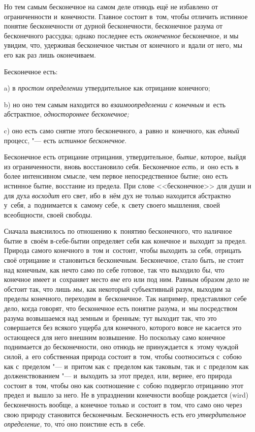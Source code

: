 Но тем самым бесконечное на самом деле отнюдь ещё не избавлено от
ограниченности и~конечности. Главное состоит в~том, чтобы отличить истинное
понятие бесконечности от дурной бесконечности, бесконечное разума от
бесконечного рассудка; однако последнее есть {\em оконеченное} бесконечное, и
мы увидим, что, удерживая бесконечное чистым от конечного и~вдали от него, мы
его как раз лишь оконечиваем.

Бесконечное есть:

a) в {\em простом определении} утвердительное как отрицание конечного;

b) но оно тем самым находится во {\em взаимоопределении
с конечным} и~есть абстрактное, {\em одностороннее бесконечное;}

c) оно есть само снятие этого бесконечного, а~равно и~конечного, как
{\em единый} процесс, "--- есть {\em истинное бесконечное}.


Бесконечное есть отрицание отрицания, утвердительное,
{\em бытие,} которое, выйдя из ограниченности, вновь
восстановило себя. Бесконечное {\em есть,} и~оно есть в
более интенсивном смысле, чем первое непосредственное бытие; оно есть
истинное бытие, восстание из предела. При слове <<бесконечное>> для души и
для духа {\em восходит} его свет, ибо в~нём дух не
только находится абстрактно у~себя, а~поднимается к~самому себе, к~свету
своего мышления, своей всеобщности, своей свободы.

Сначала выяснилось по отношению к~понятию бесконечного, что наличное бытие
в~своём в-себе-бытии определяет себя как конечное и~выходит за предел. Природа
самого конечного в~том и~состоит, чтобы выходить за себя, отрицать своё
отрицание и~становиться бесконечным. Бесконечное, стало быть, не стоит над
конечным, как нечто само по себе готовое, так что выходило бы, что конечное
имеет и~сохраняет место {\em вне} его или под ним. Равным образом дело не
обстоит так, что лишь {\em мы,} как некоторый субъективный разум, выходим за
пределы конечного, переходим в~бесконечное. Так например, представляют себе
дело, когда говорят, что бесконечное есть понятие разума, и~мы посредством
разума возвышаемся над земным и~бренным; тут выходит так, что это совершается
без всякого ущерба для конечного, которого вовсе не касается это остающееся для
него внешним возвышение. Но поскольку само конечное поднимается до
бесконечности, оно отнюдь не принуждается к~этому чуждой силой, а~его
собственная природа состоит в~том, чтобы соотноситься с~собою как с~пределом
"--- и~притом как с~пределом как таковым, так и~с пределом как долженствованием
"--- и~выходить за этот предел, или, вернее, его природа состоит в~том, чтобы
оно как соотношение с~собою подвергло отрицанию этот предел и~вышло за него. Не
в упразднении конечности вообще рождается (wird) бесконечность вообще, а
конечное только и~состоит в~том, что само оно через свою природу становится
бесконечным. Бесконечность есть его {\em утвердительное определение,}
то, чт\'{о} оно поистине есть в~себе.

